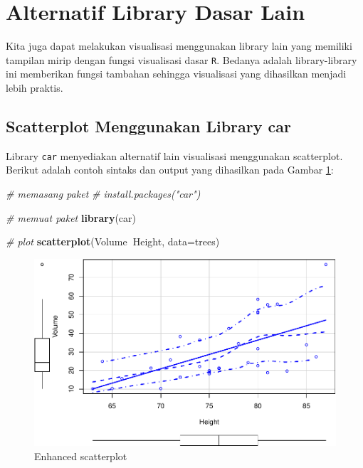 \documentclass[]{book}
\newenvironment{Shaded}{\begin{snugshade}}{\end{snugshade}}
\newcommand{\KeywordTok}[1]{\textcolor[rgb]{0.13,0.29,0.53}{\textbf{#1}}}
\newcommand{\DataTypeTok}[1]{\textcolor[rgb]{0.13,0.29,0.53}{#1}}
\newcommand{\CommentTok}[1]{\textcolor[rgb]{0.56,0.35,0.01}{\textit{#1}}}
\newcommand{\OperatorTok}[1]{\textcolor[rgb]{0.81,0.36,0.00}{\textbf{#1}}}
\newcommand{\NormalTok}[1]{#1}
\begin{document}
\section{Alternatif Library Dasar
Lain}\label{alternatif-library-dasar-lain}

Kita juga dapat melakukan visualisasi menggunakan library lain yang
memiliki tampilan mirip dengan fungsi visualisasi dasar \texttt{R}.
Bedanya adalah library-library ini memberikan fungsi tambahan sehingga
visualisasi yang dihasilkan menjadi lebih praktis.

\subsection{Scatterplot Menggunakan Library
car}\label{scatterplot-menggunakan-library-car}

Library \texttt{car} menyediakan alternatif lain visualisasi menggunakan
scatterplot. Berikut adalah contoh sintaks dan output yang dihasilkan
pada Gambar \ref{fig:carscatter}:

\begin{Shaded}
\begin{Highlighting}[]
\CommentTok{# memasang paket}
\CommentTok{# install.packages("car")}

\CommentTok{# memuat paket}
\KeywordTok{library}\NormalTok{(car)}

\CommentTok{# plot}
\KeywordTok{scatterplot}\NormalTok{(Volume}\OperatorTok{~}\NormalTok{Height, }\DataTypeTok{data=}\NormalTok{trees)}
\end{Highlighting}
\end{Shaded}

\begin{figure}

{\centering \includegraphics[width=0.7\linewidth]{EnvStat_files/figure-latex/carscatter-1} 

}

\caption{Enhanced scatterplot}\label{fig:carscatter}
\end{figure}
\end{document}
